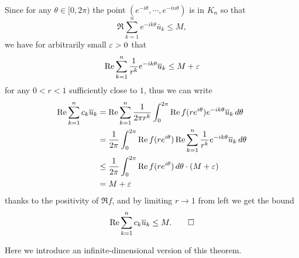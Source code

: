 \documentclass[a4paper]{article}
\begin{document}
\begin{pf}
Since for any $\theta\in[0,2\pi)$ the point $(e^{-i\theta},\cdots,e^{-in\theta})$ is in $K_n$ so that
\[\Re\sum_{k=1}^ne^{-ik\theta}\bar u_k\le M,\]
we have for arbitrarily small $\e>0$ that
\[\Re\sum_{k=1}^n\frac1{r^k}e^{-ik\theta}\bar u_k\le M+\e\]
for any $0<r<1$ sufficiently close to $1$, thus we can write
\begin{align*}
\Re\sum_{k=1}^nc_k\bar u_k
&=\Re\sum_{k=1}^n\frac1{2\pi r^k}\int_0^{2\pi}\Re f(re^{i\theta})e^{-ik\theta}\bar u_k\,d\theta\\
&=\frac1{2\pi}\int_0^{2\pi}\Re f(re^{i\theta})\Re\sum_{k=1}^n\frac1{r^k}e^{-ik\theta}\bar u_k\,d\theta\\
&\le\frac1{2\pi}\int_0^{2\pi}\Re f(re^{i\theta})\,d\theta\cdot(M+\e)\\
&=M+\e
\end{align*}
thanks to the positivity of $\Re f$, and by limiting $r\to1$ from left we get the bound
\[\Re\sum_{k=1}^nc_k\bar u_k\le M.\qedhere\]
\end{pf}

Here we introduce an infinite-dimensional version of this theorem.
\end{document}
